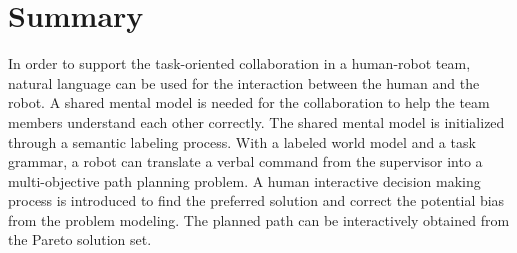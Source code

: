 \section{Summary}
\label{sec:summary}

In order to support the task-oriented collaboration in a human-robot team, natural language can be used for the interaction between the human and the robot.
A shared mental model is needed for the collaboration to help the team members understand each other correctly.
The shared mental model is initialized through a semantic labeling process.
With a labeled world model and a task grammar, a robot can translate a verbal command from the supervisor into a multi-objective path planning problem.
A human interactive decision making process is introduced to find the preferred solution and correct the potential bias from the problem modeling.
The planned path can be interactively obtained from the Pareto solution set.

